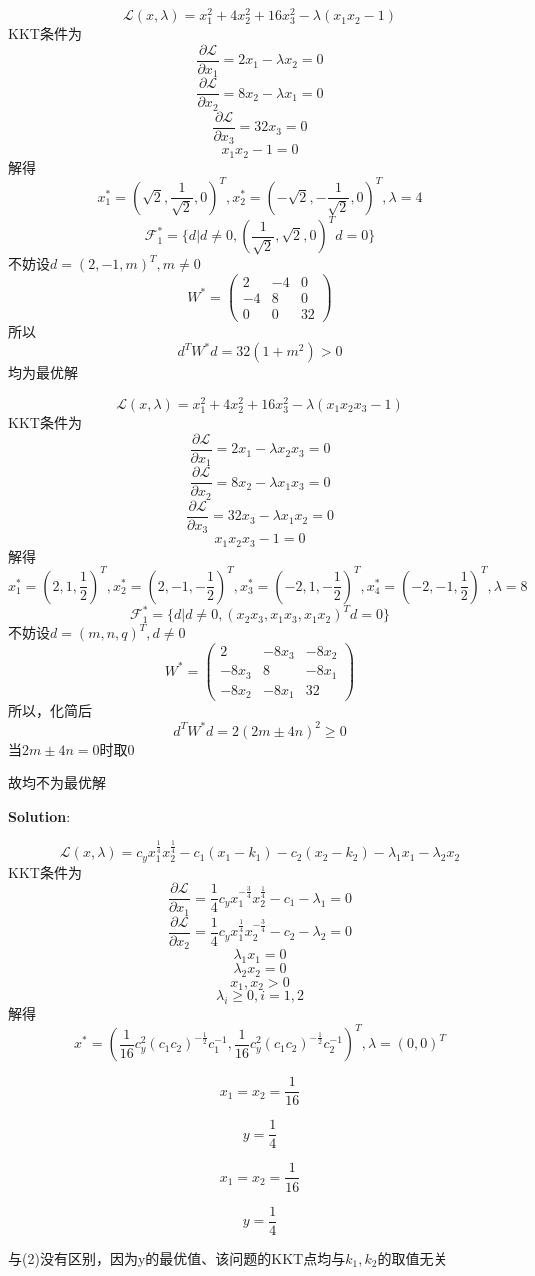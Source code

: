 \documentclass[a4 paper]{article}
\begin{document}

$$\mathcal{L}(x,\lambda) =x_1^2+4x_2^2+16x_3^2-\lambda(x_1 x_2-1)$$
KKT条件为
$$\frac{\partial \mathcal{L}}{\partial x_1}=2x_1-\lambda x_2=0$$
$$\frac{\partial \mathcal{L}}{\partial x_2}=8x_2-\lambda x_1=0$$
$$\frac{\partial \mathcal{L}}{\partial x_3}=32x_3=0$$
$$x_1x_2-1=0$$
解得
$$x_1^\ast=(\sqrt{2},\frac{1}{\sqrt{2}},0)^T,x_2^\ast=(-\sqrt{2},-\frac{1}{\sqrt{2}},0)^T,\lambda=4$$
$$\mathcal{F}_1^\ast=\{d|d\neq 0,(\frac{1}{\sqrt{2}},\sqrt{2},0)^Td=0\}$$
不妨设$d=(2,-1,m)^T,m\neq 0$
$$W^\ast=\begin{pmatrix}2& -4 & 0\\-4& 8 & 0\\0&0&32\end{pmatrix}$$
所以 $$ d^T W^\ast d=32(1+m^2)>0$$
均为最优解


$$\mathcal{L}(x,\lambda) =x_1^2+4x_2^2+16x_3^2-\lambda(x_1 x_2 x_3-1)$$
KKT条件为
$$\frac{\partial \mathcal{L}}{\partial x_1}=2x_1-\lambda x_2 x_3=0$$
$$\frac{\partial \mathcal{L}}{\partial x_2}=8x_2-\lambda x_1 x_3=0$$
$$\frac{\partial \mathcal{L}}{\partial x_3}=32x_3-\lambda x_1 x_2=0$$
$$x_1x_2x_3-1=0$$
解得
$$x_1^\ast=(2,1,\frac{1}{2})^T,x_2^\ast=(2,-1,-\frac{1}{2})^T,x_3^\ast=(-2,1,-\frac{1}{2})^T,x_4^\ast=(-2,-1,\frac{1}{2})^T,\lambda=8$$
$$\mathcal{F}_1^\ast=\{d|d\neq 0,(x_2 x_3,x_1x_3,x_1x_2)^Td=0\}$$
不妨设$d=(m,n,q)^T,d\neq 0$
$$W^\ast=\begin{pmatrix}2& -8x_3 & -8x_2\\-8x_3& 8 & -8x_1\\-8x_2&-8x_1&32\end{pmatrix}$$
所以，化简后 $$ d^T W^\ast d=2(2m\pm 4n)^2 \geqslant 0$$当$2m\pm4n=0$时取0

故均不为最优解

\textbf{Solution}:


$$\mathcal{L}(x,\lambda) =c_y x_1^{\frac{1}{4}} x_2^{\frac{1}{4}}-c_1(x_1-k_1)-c_2(x_2-k_2)-\lambda_1 x_1-\lambda_2 x_2$$
KKT条件为
$$\frac{\partial \mathcal{L}}{\partial x_1}=\frac{1}{4}c_y x_1^{-\frac{3}{4}}x_2^{\frac{1}{4}}-c_1-\lambda_1=0$$
$$\frac{\partial \mathcal{L}}{\partial x_2}=\frac{1}{4}c_y x_1^{\frac{1}{4}} x_2^{-\frac{3}{4}}-c_2-\lambda_2=0$$
$$\lambda_1x_1=0$$
$$\lambda_2x_2=0$$
$$x_1,x_2 >0$$
$$\lambda_i \geqslant 0, i=1,2$$
解得
$$x^\ast=(\frac{1}{16}c_y^2 (c_1c_2)^{-\frac{1}{2}}c_1^{-1},\frac{1}{16}c_y^2 (c_1c_2)^{-\frac{1}{2}}c_2^{-1})^T,\lambda=(0,0)^T$$


$$x_1=x_2=\frac{1}{16}$$

$$y=\frac{1}{4}$$


$$x_1=x_2=\frac{1}{16}$$

$$y=\frac{1}{4}$$

与(2)没有区别，因为y的最优值、该问题的KKT点均与$k_1,k_2$的取值无关
\end{document}
